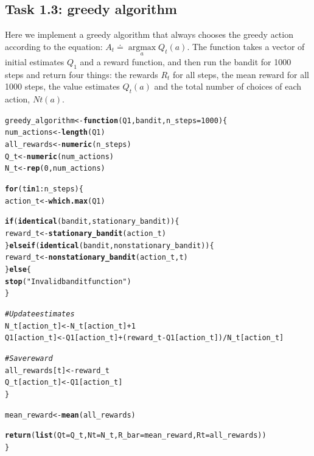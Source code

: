 \documentclass[10pt, a4paper, english]{article}\usepackage[]{graphicx}\usepackage[dvipsnames]{xcolor}
\makeatletter
\newcommand{\hlnum}[1]{\textcolor[rgb]{0.686,0.059,0.569}{#1}}%
\newcommand{\hlstr}[1]{\textcolor[rgb]{0.192,0.494,0.8}{#1}}%
\newcommand{\hlcom}[1]{\textcolor[rgb]{0.678,0.584,0.686}{\textit{#1}}}%
\newcommand{\hlopt}[1]{\textcolor[rgb]{0,0,0}{#1}}%
\newcommand{\hlstd}[1]{\textcolor[rgb]{0.345,0.345,0.345}{#1}}%
\newcommand{\hlkwa}[1]{\textcolor[rgb]{0.161,0.373,0.58}{\textbf{#1}}}%
\newcommand{\hlkwb}[1]{\textcolor[rgb]{0.69,0.353,0.396}{#1}}%
\newcommand{\hlkwc}[1]{\textcolor[rgb]{0.333,0.667,0.333}{#1}}%
\newcommand{\hlkwd}[1]{\textcolor[rgb]{0.737,0.353,0.396}{\textbf{#1}}}%
\newenvironment{kframe}{%
 \def\at@end@of@kframe{}%
 \ifinner\ifhmode%
  \def\at@end@of@kframe{\end{minipage}}%
  \begin{minipage}{\columnwidth}%
 \fi\fi%
 \def\FrameCommand##1{\hskip\@totalleftmargin \hskip-\fboxsep
 \colorbox{shadecolor}{##1}\hskip-\fboxsep
     \hskip-\linewidth \hskip-\@totalleftmargin \hskip\columnwidth}%
 \MakeFramed {\advance\hsize-\width
   \@totalleftmargin\z@ \linewidth\hsize
   \@setminipage}}%
 {\par\unskip\endMakeFramed%
 \at@end@of@kframe}
\newenvironment{knitrout}{}{} %
\makeatother
\begin{document}
\subsection{Task 1.3:  greedy algorithm}
 Here we implement a greedy algorithm that always chooses the greedy action according to the equation: $A_t \doteq \underset{a}{\operatorname{argmax}} Q_t(a)$. The function takes a vector of initial estimates $Q_1$ and a reward function, and then run the bandit for 1000 steps and return four things: the rewards $R_t$ for all steps, the mean reward for all 1000 steps, the value estimates $Q_t(a)$ and the total number of choices of each action, $Nt(a)$.
\begin{knitrout}
\color{fgcolor}\begin{kframe}
\begin{alltt}
\hlstd{greedy_algorithm} \hlkwb{<-} \hlkwa{function}\hlstd{(}\hlkwc{Q1}\hlstd{,} \hlkwc{bandit}\hlstd{,} \hlkwc{n_steps} \hlstd{=} \hlnum{1000}\hlstd{) \{}
  \hlstd{num_actions} \hlkwb{<-} \hlkwd{length}\hlstd{(Q1)}
  \hlstd{all_rewards} \hlkwb{<-} \hlkwd{numeric}\hlstd{(n_steps)}
  \hlstd{Q_t} \hlkwb{<-} \hlkwd{numeric}\hlstd{(num_actions)}
  \hlstd{N_t} \hlkwb{<-} \hlkwd{rep}\hlstd{(}\hlnum{0}\hlstd{, num_actions)}

  \hlkwa{for} \hlstd{(t} \hlkwa{in} \hlnum{1}\hlopt{:}\hlstd{n_steps) \{}
    \hlstd{action_t} \hlkwb{<-} \hlkwd{which.max}\hlstd{(Q1)}

    \hlkwa{if} \hlstd{(}\hlkwd{identical}\hlstd{(bandit, stationary_bandit)) \{}
      \hlstd{reward_t} \hlkwb{<-} \hlkwd{stationary_bandit}\hlstd{(action_t)}
    \hlstd{\}} \hlkwa{else if} \hlstd{(}\hlkwd{identical}\hlstd{(bandit, nonstationary_bandit)) \{}
      \hlstd{reward_t} \hlkwb{<-} \hlkwd{nonstationary_bandit}\hlstd{(action_t, t)}
    \hlstd{\}} \hlkwa{else} \hlstd{\{}
      \hlkwd{stop}\hlstd{(}\hlstr{"Invalid bandit function"}\hlstd{)}
    \hlstd{\}}

    \hlcom{# Update estimates}
    \hlstd{N_t[action_t]} \hlkwb{<-} \hlstd{N_t[action_t]} \hlopt{+} \hlnum{1}
    \hlstd{Q1[action_t]} \hlkwb{<-} \hlstd{Q1[action_t]} \hlopt{+} \hlstd{(reward_t} \hlopt{-} \hlstd{Q1[action_t])} \hlopt{/} \hlstd{N_t[action_t]}

    \hlcom{# Save reward}
    \hlstd{all_rewards[t]} \hlkwb{<-} \hlstd{reward_t}
    \hlstd{Q_t[action_t]} \hlkwb{<-} \hlstd{Q1[action_t]}
  \hlstd{\}}

  \hlstd{mean_reward} \hlkwb{<-} \hlkwd{mean}\hlstd{(all_rewards)}

  \hlkwd{return}\hlstd{(}\hlkwd{list}\hlstd{(}\hlkwc{Qt} \hlstd{= Q_t,} \hlkwc{Nt} \hlstd{= N_t,} \hlkwc{R_bar} \hlstd{= mean_reward,} \hlkwc{Rt} \hlstd{= all_rewards))}
\hlstd{\}}
\end{alltt}
\end{kframe}
\end{knitrout}
\end{document}
